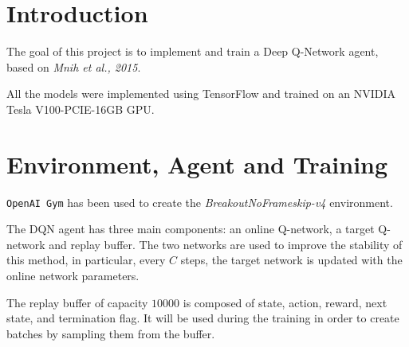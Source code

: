 \documentclass[a4paper,12pt]{article} %
\begin{document}
	\thispagestyle{empty}  
	\vspace{0.4cm}

	
	\section{Introduction}
	\label{section:intro}
	
	The goal of this project is to implement and train a Deep Q-Network agent, based on \textit{Mnih et al., 2015}.
	
	All the models were implemented using TensorFlow and trained on an NVIDIA Tesla V100-PCIE-16GB GPU.
	
	\section{Environment, Agent and Training}
	\label{section:agent}	
	\texttt{OpenAI Gym} has been used to create the \textit{BreakoutNoFrameskip-v4} environment. 
	
	The DQN agent has three main components: an online Q-network, a target Q-network and replay buffer.
	The two networks are used to improve the stability of this method, in particular, every $C$ steps, the target network is updated with the online network parameters.
	
	The replay buffer of capacity $10000$ is composed of state, action, reward, next state, and termination flag. It will be used during the training in order to create batches by sampling them from the buffer.
	
\end{document}
